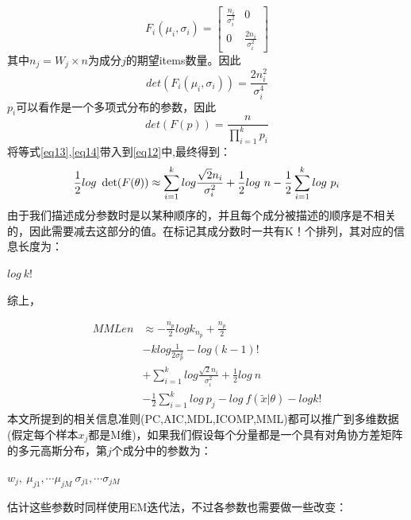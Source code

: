 \documentclass[a4paper,12pt,openany,oneside,utf-8]{ctexbook}
\begin{document}
    \begin{equation}\label{eq12}
        F_i(\mu_i,\sigma_i)=\begin{bmatrix}
    \frac{n_i}{\sigma_i^2} &0 \\ 
    0 & \frac{2n_i}{\sigma_i^2}
    \end{bmatrix}
    \end{equation}
    其中$n_j=W_j\times n$为成分$j$的期望items数量。因此
    \begin{equation}\label{eq13}
        det(F_i(\mu_i,\sigma_i))=\frac{2n_i^2}{\sigma_i^4}
    \end{equation}
    $p_i$可以看作是一个多项式分布的参数，因此
    \begin{equation}\label{eq14}
        det(F(p))=\frac{n}{\prod_{i=1}^{k}p_i}
    \end{equation}
    将等式\ref{eq13},\ref{eq14}带入到\ref{eq12}中,最终得到：
    \begin{equation}\label{eq15}
        \frac{1}{2}log\ \det(F(\theta))\approx \sum_{i=1}^{k}log\frac{\sqrt{2}n_i}{\sigma_i^2}+\frac{1}{2} log\ n\\ -\frac{1}{2}\sum_{i=1}^{k}log\ p_i
    \end{equation}
    由于我们描述成分参数时是以某种顺序的，并且每个成分被描述的顺序是不相关的，因此需要减去这部分的值。在标记其成分数时一共有K！个排列，其对应的信息长度为：
    \begin{center}
        $log\ k!$
    \end{center}
    综上，
    
    \begin{equation}
    \begin{aligned}
    MMLen &\approx -\frac{n_p}{2}log k_{n_p}+\frac{n_p}{2}\\&-k log\frac{1}{2\sigma_p^2}-log(k-1)!\\&+\sum_{i=1}^k log\frac{\sqrt{2}n_i}{\sigma_i^2}+\frac{1}{2}log\ n\\&-\frac{1}{2}\sum_{i=1}^klog\ p_j-log\ f(\tilde{x}|\theta)-logk!
    \end{aligned}
    \end{equation}
	本文所提到的相关信息准则(PC,AIC,MDL,ICOMP,MML)都可以推广到多维数据(假定每个样本$x_j$都是M维)，如果我们假设每个分量都是一个具有对角协方差矩阵的多元高斯分布，第$j$个成分中的参数为：
	\begin{center}
	    $w_j,\ \mu_{j1},\cdots \mu_{jM}\ \sigma_{j1},\cdots \sigma_{jM} $
	\end{center}
	
	估计这些参数时同样使用EM迭代法，不过各参数也需要做一些改变：
	
\end{document}
